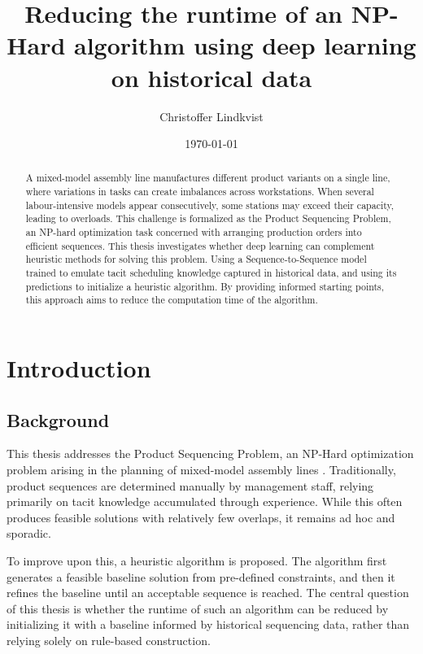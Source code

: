 \documentclass[12pt,a4paper]{report}
\begin{document}
\title{Reducing the runtime of an NP-Hard algorithm using deep learning on historical data}
\author{Christoffer Lindkvist}
\date{\today}
\maketitle

\begin{abstract} 
    A mixed-model assembly line manufactures different product variants on a single line, where variations in tasks can create imbalances across workstations. When several labour-intensive models appear consecutively, some stations may exceed their capacity, leading to overloads. This challenge is formalized as the Product Sequencing Problem, an NP-hard optimization task concerned with arranging production orders into efficient sequences. This thesis investigates whether deep learning can complement heuristic methods for solving this problem. Using a Sequence-to-Sequence model trained to emulate tacit scheduling knowledge captured in historical data, and using its predictions to initialize a heuristic algorithm. By providing informed starting points, this approach aims to reduce the computation time of the algorithm.
\end{abstract}

\tableofcontents

\chapter{Introduction}
\section{Background}
This thesis addresses the Product Sequencing Problem, an NP-Hard optimization problem arising in the planning of mixed-model assembly lines \cite{ref6}. Traditionally, product sequences are determined manually by management staff, relying primarily on tacit knowledge accumulated through experience. While this often produces feasible solutions with relatively few overlaps, it remains ad hoc and sporadic. %

To improve upon this, a heuristic algorithm is proposed. The algorithm first generates a feasible baseline solution from pre-defined constraints, and then it refines the baseline until an acceptable sequence is reached. The central question of this thesis is whether the runtime of such an algorithm can be reduced by initializing it with a baseline informed by historical sequencing data, rather than relying solely on rule-based construction.
\end{document}
